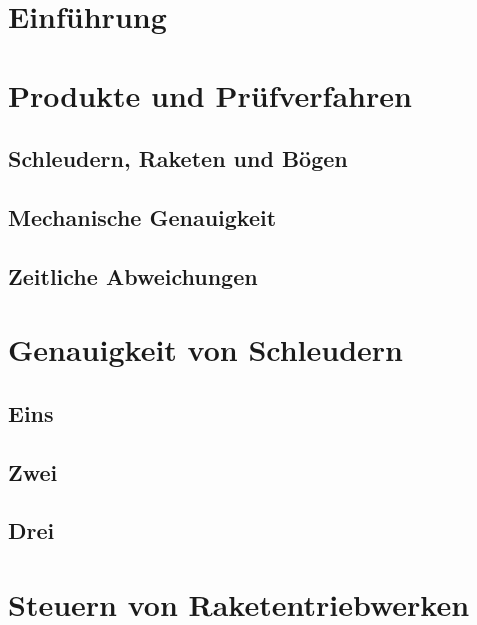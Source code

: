 \documentclass[11pt,a4paper]{report}
\begin{document}

\begin{abstract}

\end{abstract}

\tableofcontents

\chapter{Einführung} \label{chap:einf}


\chapter{Produkte und Prüfverfahren} \label{chap:ppv}

\section{Schleudern, Raketen und Bögen} \label{sec:was}

\section{Mechanische Genauigkeit} \label{sec:mec}

\section{Zeitliche Abweichungen} \label{sec:time}

\chapter{Genauigkeit von Schleudern} \label{chap:sling}

\section{Eins}

\section{Zwei}

\section{Drei}

\chapter{Steuern von Raketentriebwerken} \label{chap:rocket}
\end{document}
